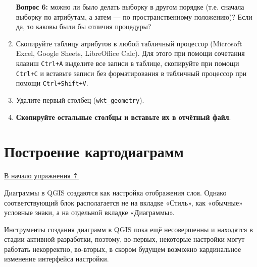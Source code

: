\documentclass[
  12pt,
]{book}
\begin{document}
\begin{enumerate}
  \textbf{Вопрос 6:} можно ли было делать выборку в другом порядке (т.е. сначала выборку по атрибутам, а затем --- по пространственному положению)? Если да, то каковы были бы отличия процедуры?
\item
  Скопируйте таблицу атрибутов в любой табличный процессор (Microsoft Excel, Google Sheets, LibreOffice Calc). Для этого при помощи сочетания клавиш \texttt{Ctrl+A} выделите все записи в таблице, скопируйте при помощи \texttt{Ctrl+C} и вставьте записи без форматирования в табличный процессор при помощи \texttt{Ctrl+Shift+V}.
\item
  Удалите первый столбец (\texttt{wkt\_geometry}).
\item
  \textbf{Скопируйте остальные столбцы и вставьте их в отчётный файл}.
\end{enumerate}

\hypertarget{map-ref-districts-diagrams}{%
\section{Построение картодиаграмм}\label{map-ref-districts-diagrams}}

\protect\hyperlink{map-ref-districts}{В начало упражнения ⇡}

Диаграммы в QGIS создаются как настройка отображения слоя. Однако соответствующий блок располагается не на вкладке «Стиль», как «обычные» условные знаки, а на отдельной вкладке «Диаграммы».

Инструменты создания диаграмм в QGIS пока ещё несовершенны и находятся в стадии активной разработки, поэтому, во-первых, некоторые настройки могут работать некорректно, во-вторых, в скором будущем возможно кардинальное изменение интерфейса настройки.
\end{document}
